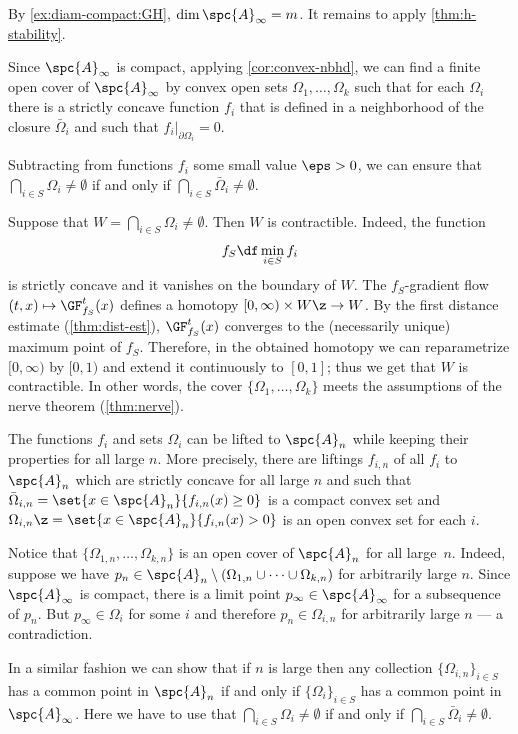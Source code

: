 By \ref{ex:diam-compact:GH}, $\dim \spc{A}_\infty=m$.
It remains to apply \ref{thm:h-stability}.
\qeds

Since $\spc{A}_\infty$ is compact, applying \ref{cor:convex-nbhd}, we can find a finite open cover of $\spc{A}_\infty$ by convex open sets $\Omega_1,\dots, \Omega_k$ such that 
for each $\Omega_i$ there is a strictly concave function $f_i$ that is defined in a neighborhood of the closure $\bar \Omega_i$ and such that $f_i|_{\partial \Omega_i}=0$.

Subtracting from functions $f_i$ some small value $\eps>0$,
we can ensure that $\bigcap_{i\in S}\Omega_{i}\ne \emptyset$ if and only if $\bigcap_{i\in S}\bar\Omega_{i}\ne \emptyset$.

Suppose that $W=\bigcap_{i\in S}\Omega_{i}\ne \emptyset$.
Then $W$ is contractible.
Indeed, the function 
\[f_S\df\min_{i\in S} f_i\]
is strictly concave and it vanishes on the boundary of $W$.
The $f_S$-gradient flow $(t,x)\mapsto \GF_{f_S}^t(x)$ defines a homotopy
$[0,\infty)\times W\z\to W$.
By the first distance estimate (\ref{thm:dist-est}), $\GF_{f_S}^t(x)$ converges to the (necessarily unique) maximum point of $f_S$.
Therefore, in the obtained homotopy we can reparametrize $[0,\infty)$ by $[0,1)$ and extend it continuously to $[0,1]$;
thus we get that $W$ is contractible.
In other words, the cover $\{\Omega_1,\dots, \Omega_k\}$ meets the assumptions of the nerve theorem (\ref{thm:nerve}).

The functions $f_i$ and sets $\Omega_i$ can be lifted to $\spc{A}_n$ while keeping their properties for all large $n$.
More precisely, there are liftings $f_{i,n}$ of all $f_i$ to $\spc{A}_n$ which are strictly concave for all large $n$ and such that $\bar\Omega_{i,n}=\set{x\in \spc{A}_n}{f_{i,n}(x)\ge 0}$ is a compact convex set and $\Omega_{i,n}\z=\set{x\in \spc{A}_n}{f_{i,n}(x)> 0}$ is an open convex set for each $i$.

Notice that $\{\Omega_{1,n},\dots,\Omega_{k,n}\}$ is an open cover of $\spc{A}_n$ for all large~$n$.
Indeed, suppose we have $p_n\in \spc{A}_n\setminus(\Omega_{1,n}\cup\dots\cup\Omega_{k,n})$ for arbitrarily large $n$.
Since $\spc{A}_\infty$ is compact, there is a limit point $p_\infty\in \spc{A}_\infty$ for a subsequence of $p_n$.
But $p_\infty\in\Omega_i$ for some $i$ and therefore $p_n\in \Omega_{i,n}$ for arbitrarily large $n$ --- a contradiction.

In a similar fashion we can show that if $n$ is large then any collection $\{\Omega_{i,n}\}_{i\in S}$ has a common point in $\spc{A}_n$ 
if and only if $\{\Omega_{i}\}_{i\in S}$ has a common point in $\spc{A}_\infty$.
Here we have to use that $\bigcap_{i\in S}\Omega_{i}\ne \emptyset$ if and only if $\bigcap_{i\in S}\bar\Omega_{i}\ne \emptyset$.

